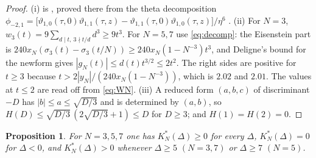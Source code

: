 \documentclass[mathematics,article,submit,pdftex,oneauthor]{Definitions/mdpi}
\numberwithin{equation}{section}
\theoremstyle{plain}
\newtheorem{prop}[thm]{Proposition}
\theoremstyle{remark}
\newcommand{\pmi}{\phi_{-2,1}}
\begin{document}
\begin{proof}
(i) is \cite[Lemma~4(i)]{Bha26a}, proved there from the theta decomposition $\pmi=\bigl[\vartheta_{1,0}(\tau,0)\vartheta_{1,1}(\tau,z)-\vartheta_{1,1}(\tau,0)\vartheta_{1,0}(\tau,z)\bigr]/\eta^6$ \cite{BM13}. (ii) For $N=3$, $w_3(t)=9\sum_{d\mid t,\ 3\nmid t/d}d^3\ge9t^3$. For $N=5,7$ use \eqref{eq:decomp}: the Eisenstein part is $240x_N(\sigma_3(t)-\sigma_3(t/N))\ge240x_N(1-N^{-3})t^3$, and Deligne's bound \cite{Del74} for the newform gives $|g_N(t)|\le d(t)t^{3/2}\le2t^2$. The right sides are positive for $t\ge3$ because $t>2|y_N|/(240x_N(1-N^{-3}))$, which is $2.02$ and $2.01$. The values at $t\le2$ are read off from \eqref{eq:WN}. (iii) A reduced form $(a,b,c)$ of discriminant $-D$ has $|b|\le a\le\sqrt{D/3}$ and is determined by $(a,b)$, so $H(D)\le\sqrt{D/3}\,(2\sqrt{D/3}+1)\le D$ for $D\ge3$; and $H(1)=H(2)=0$.
\end{proof}

\begin{prop}\label{prop:sign}
For $N=3,5,7$ one has $K^*_N(\Delta)\ge0$ for every $\Delta$, $K^*_N(\Delta)=0$ for $\Delta<0$, and $K^*_N(\Delta)>0$ whenever $\Delta\ge5$ $(N=3,7)$ or $\Delta\ge7$ $(N=5)$.
\end{prop}
\end{document}
